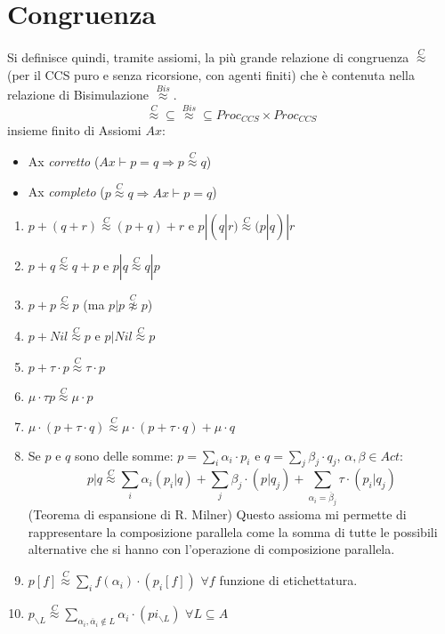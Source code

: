 \section{Congruenza}
Si definisce quindi, tramite assiomi, la più grande relazione di congruenza
$\stackrel{C}{\approx}$ (per il CCS puro e senza ricorsione, con agenti finiti)
che è contenuta nella relazione di Bisimulazione $\stackrel{Bis}{\approx}$.
\begin{equation}
    \stackrel{C}{\approx} \subseteq \stackrel{Bis}{\approx} \subseteq Proc_{CCS} \times Proc_{CCS}
\end{equation}
insieme finito di Assiomi $Ax$:
\begin{itemize}
    \item Ax \textit{corretto} ($Ax \vdash p = q \Rightarrow p \stackrel{C}{\approx} q$)
    \item Ax \textit{completo} ($p \stackrel{C}{\approx} q \Rightarrow Ax \vdash p = q$)
\end{itemize}
\begin{enumerate}
    \item $p + (q + r) \stackrel{C}{\approx} (p + q) + r$ e $p | (q | r) \stackrel{C}{\approx} (p | q) | r$
    \item $p + q \stackrel{C}{\approx} q + p$ e $p | q \stackrel{C}{\approx} q | p$
    \item $p + p \stackrel{C}{\approx} p$ (ma $p | p \stackrel{C}{\not\approx} p$)
    \item $p + Nil \stackrel{C}{\approx} p$ e $p | Nil \stackrel{C}{\approx} p$
    \item $p + \tau \cdot p \stackrel{C}{\approx} \tau \cdot p$
    \item $\mu \cdot \tau p \stackrel{C}{\approx} \mu \cdot p$
    \item $\mu \cdot (p + \tau \cdot q) \stackrel{C}{\approx} \mu \cdot (p + \tau \cdot q) + \mu \cdot q$
    \item Se $p$ e $q$ sono delle somme: $p = \sum_{i} \alpha_i \cdot p_i$ e
          $q = \sum_{j} \beta_j \cdot q_j$,  $\alpha, \beta \in Act$:
          $$p | q \stackrel{C}{\approx} \sum_{i} \alpha_i (p_{i} | q) + \sum_{j} \beta_{j} \cdot (p|q_{j}) + \sum_{\alpha_i = \overline{\beta}_{j}} \tau \cdot (p_{i} | q_{j})$$
          (Teorema di espansione di R. Milner) Questo assioma mi permette di rappresentare
          la composizione parallela come la somma di tutte le possibili alternative
          che si hanno con l'operazione di composizione parallela.
    \item $p[f] \stackrel{C}{\approx} \sum_{i} f(\alpha_i) \cdot (p_{i} [f])$ $\forall f$
          funzione di etichettatura.
    \item $p_{\backslash L} \stackrel{C}{\approx} \sum_{\alpha_i,\overline{\alpha}_i \not\in L} \alpha_i \cdot (pi_{\backslash L})$ $\forall L \subseteq A$
\end{enumerate}